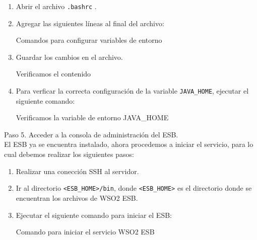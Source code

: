\begin{enumerate}
  \item Abrir el archivo \texttt{.bashrc} .
  \item Agregar las siguientes líneas al final del archivo: \\
        \begin{listing}[H]
          \caption{Comandos para configurar variables de entorno}
          \label{soa:tecnologias:wso2:bash-configurar-variables-de-entorno}
        \end{listing}
  \item Guardar los cambios en el archivo. \\
        \begin{listing}[H]
          \caption{Verificamos el contenido}
          \label{soa:tecnologias:wso2:bash-cat}
        \end{listing}
  \item Para verficar la correcta configuración de la variable \verb|JAVA_HOME|, ejecutar el siguiente comando: \\
        \begin{listing}[H]
          \caption{Verificamos la variable de entorno JAVA\_HOME}
          \label{soa:tecnologias:wso2:bash-verificar-variable-de-entorno}
        \end{listing}
\end{enumerate}

Paso 5. Acceder a la consola de administración del ESB.\\
El ESB ya se encuentra instalado, ahora procedemos a iniciar el servicio, para lo cual debemos realizar los siguientes pasos:

\begin{enumerate}
  \item Realizar una conección SSH al servidor.
  \item Ir al directorio \verb|<ESB_HOME>/bin|, donde \verb|<ESB_HOME>| es el directorio donde se encuentran los archivos de WSO2 ESB.
  \item Ejecutar el siguiente comando para iniciar el ESB:\\
        \begin{listing}[H]
          \caption{Comando para iniciar el servicio WSO2 ESB}
          \label{soa:tecnologias:wso2:bash-inicio-de-servicio}
        \end{listing}
\end{enumerate}


